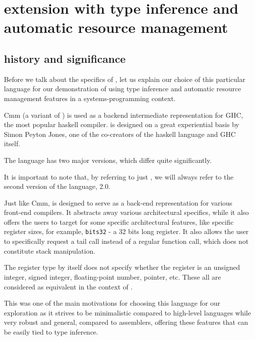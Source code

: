 \chapter{\cmm{} extension with type inference and automatic resource management}

\label{chap2}



\section{\cmm{} history and significance}

Before we talk about the specifics of \cmm{}, let us explain our choice of this particular language for our demonstration of using type inference and automatic resource management features in a systems-programming context.

Cmm (a variant of \cmm{}) is used as a backend intermediate representation for GHC, the most popular haskell compiler. \cmm{} is designed on a great experiential basis by Simon Peyton Jones, one of the co-creators of the haskell language and GHC itself.

\begin{remark}
    The \cmm{} language has two major versions, which differ quite significantly.

    It is important to note that, by referring to just \cmm{}, we will always refer to the second version of the language, \cmm{} 2.0.
\end{remark}

Just like Cmm, \cmm{} is designed to serve as a back-end representation for various front-end compilers. It abstracts away various architectural specifics, while it also offers the users to target for some specific architectural features, like specific register sizes, for example, \lstinline{bits32} - a 32 bits long register. It also allows the user to specifically request a tail call instead of a regular function call, which does not constitute stack manipulation.

The register type by itself does not specify whether the register is an unsigned integer, signed integer, floating-point number, pointer, etc. These all are considered as equivalent in the context of \cmm{}.

This was one of the main motivations for choosing this language for our exploration as it strives to be minimalistic compared to high-level languages while very robust and general, compared to assemblers, offering these features that can be easily tied to type inference.

